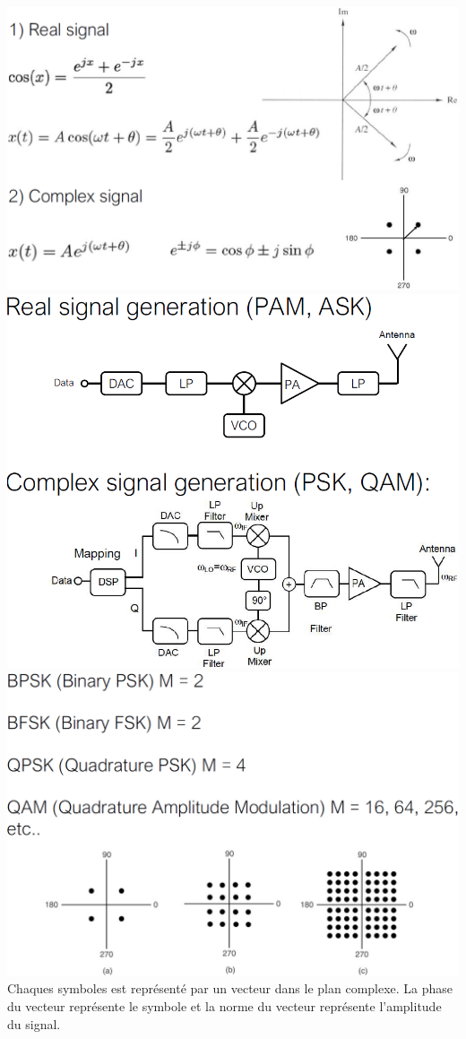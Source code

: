 \begin{multicols*}{4}
    \includegraphics[width=\columnwidth]{images/nombres_complexes.png}
    \includegraphics[width=\columnwidth]{images/signal_generation.png}
    \includegraphics[width=\columnwidth]{images/bfsk_qpsk.png}
    Chaques symboles est représenté par un vecteur dans le plan complexe. La phase du vecteur
    représente le symbole et la norme du vecteur représente l'amplitude du signal.


\end{multicols*}
